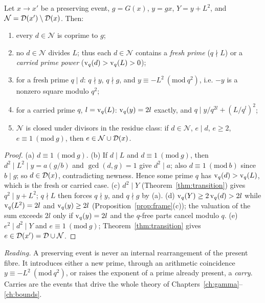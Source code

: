 \begin{theorem}\label{thm:anatomy}
Let \(x\to x'\) be a preserving event, \(g=G(x)\), \(y=gx\), \(Y=y+L^2\), and \(\mathcal N=\mathcal{D}(x')\setminus\mathcal{D}(x)\). Then:
\begin{enumerate}[label=(\alph*),nosep]
\item every \(d\in\mathcal N\) is coprime to \(g\);
\item no \(d\in\mathcal N\) divides \(L\); thus each \(d\in\mathcal N\) contains a \emph{fresh prime} (\(q\nmid L\)) or a \emph{carried prime power} (\(\operatorname{v}_q(d)>\operatorname{v}_q(L)>0\));
\item for a fresh prime \(q\mid d\): \(q\nmid y\), \(q\nmid g\), and \(y\equiv-L^2\ (\mathrm{mod}\ q^2)\), i.e. \(-y\) is a nonzero square modulo \(q^2\);
\item for a carried prime \(q\), \(l=\operatorname{v}_q(L)\): \(\operatorname{v}_q(y)=2l\) exactly, and \(q\mid y/q^{2l}+(L/q^l)^2\);
\item \(\mathcal N\) is closed under divisors in the residue class: if \(d\in\mathcal N\), \(e\mid d\), \(e\ge2\), \(e\equiv1\ (\mathrm{mod}\ g)\), then \(e\in\mathcal N\cup\mathcal{D}(x)\).
\end{enumerate}
\end{theorem}
\begin{proof}
(a) \(d\equiv1\ (\mathrm{mod}\ g)\). (b) If \(d\mid L\) and \(d\equiv1\ (\mathrm{mod}\ g)\), then \(d^2\mid L^2\mid y=a(g/b)\) and \(\gcd(d,g)=1\) give \(d^2\mid a\); also \(d\equiv1\ (\mathrm{mod}\ b)\) since \(b\mid g\); so \(d\in\mathcal{D}(x)\), contradicting newness. Hence some prime \(q\) has \(\operatorname{v}_q(d)>\operatorname{v}_q(L)\), which is the fresh or carried case. (c) \(d^2\mid Y\) (Theorem~\ref{thm:transition}) gives \(q^2\mid y+L^2\); \(q\nmid L\) then forces \(q\nmid y\), and \(q\nmid g\) by (a). (d) \(\operatorname{v}_q(Y)\ge2\operatorname{v}_q(d)>2l\) while \(\operatorname{v}_q(L^2)=2l\) and \(\operatorname{v}_q(y)\ge2l\) (Proposition~\ref{prop:frame}(c)); the valuation of the sum exceeds \(2l\) only if \(\operatorname{v}_q(y)=2l\) and the \(q\)-free parts cancel modulo \(q\). (e) \(e^2\mid d^2\mid Y\) and \(e\equiv1\ (\mathrm{mod}\ g)\); Theorem~\ref{thm:transition} gives \(e\in\mathcal{D}(x')=\mathcal{D}\cup\mathcal N\).
\end{proof}

\emph{Reading.} A preserving event is never an internal rearrangement of the present fibre. It introduces either a new prime, through an arithmetic coincidence \(y\equiv-L^2\ (\mathrm{mod}\ q^2)\), or raises the exponent of a prime already present, a \emph{carry}. Carries are the events that drive the whole theory of Chapters~\ref{ch:gamma}--\ref{ch:bounds}.

